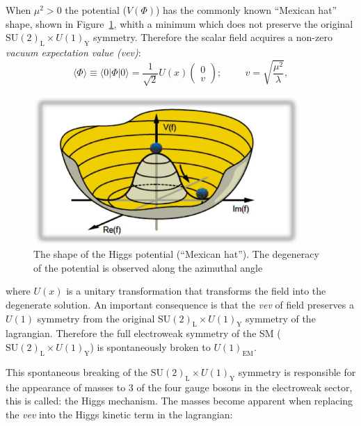 When $\mu^{2} > 0$ the potential ($V(\Phi)$) has the commonly known
``Mexican hat'' shape, shown in Figure~\ref{fig:MexHat}, whith a minimum which does not preserve the
original $\mathrm{SU(2)_{L}}\times U(1)_{\mathrm{Y}}$
symmetry. Therefore the scalar field acquires a non-zero
\textit{vacuum expectation value (vev)}:
\begin{equation}
\label{eq:vev}
\langle \Phi \rangle \equiv \langle 0 | \Phi | 0\rangle = \frac{1}{\sqrt{2}}U(x) \begin{pmatrix} 0\\
  v\end{pmatrix}; \hspace{1cm}v = \sqrt{\frac{\mu^{2}}{\lambda}},
\end{equation}

\begin{figure}
 \centering
\includegraphics[width=0.9\textwidth]{IntroFigures/MexicanHat.png}
 \caption{The shape of the Higgs potential (``Mexican hat''). The
   degeneracy of the potential is observed along the azimuthal angle\label{fig:MexHat}}
\end{figure}

where $U(x)$ is a unitary transformation that transforms the field
into the degenerate solution. An important consequence is that the
\textit{vev} of field preserves a $U(1)$ symmetry from the original
$\mathrm{SU(2)_{L}}\times U(1)_{\mathrm{Y}}$ symmetry of the
lagrangian. Therefore the full electroweak symmetry of the SM
($\mathrm{SU(2)_{L}}\times U(1)_{\mathrm{Y}}$) is spontaneously broken
to $U(1)_{\mathrm{EM}}$.

This spontaneous breaking of the $\mathrm{SU(2)_{L}}\times
U(1)_{\mathrm{Y}}$ symmetry is responsible for the appearance of
masses to 3 of the four gauge bosons in the electroweak sector, this
is called: the Higgs mechanism. The masses become apparent when
replacing the \textit{vev} into the Higgs kinetic term in the
lagrangian:


